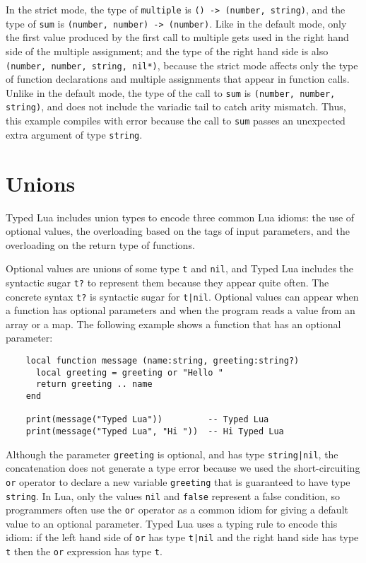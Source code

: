 In the strict mode, the type of \texttt{multiple} is \texttt{() -> (number, string)},
and the type of \texttt{sum} is \texttt{(number, number) -> (number)}.
Like in the default mode, only the first value produced by the
first call to multiple gets used in the right hand side of the
multiple assignment;
and the type of the right hand side is also
\texttt{(number, number, string, nil*)},
because the strict mode affects only the type of function declarations
and multiple assignments that appear in function calls.
Unlike in the default mode, the type of the call to \texttt{sum} is
\texttt{(number, number, string)}, and does not include the
variadic tail to catch arity mismatch.
Thus, this example compiles with error because the call to \texttt{sum}
passes an unexpected extra argument of type \texttt{string}.

\section{Unions}

Typed Lua includes union types to encode three common Lua idioms:
the use of optional values, the overloading based on the tags of
input parameters, and the overloading on the return type of functions.

Optional values are unions of some type \texttt{t} and \texttt{nil},
and Typed Lua includes the syntactic sugar \texttt{t?} to represent
them because they appear quite often.
The concrete syntax \texttt{t?} is syntactic sugar for \texttt{t|nil}.
Optional values can appear when a function has optional parameters
and when the program reads a value from an array or a map.
The following example shows a function that has an optional parameter:
\begin{verbatim}
    local function message (name:string, greeting:string?)
      local greeting = greeting or "Hello "
      return greeting .. name
    end

    print(message("Typed Lua"))         -- Typed Lua
    print(message("Typed Lua", "Hi "))  -- Hi Typed Lua
\end{verbatim}

Although the parameter \texttt{greeting} is optional, and has type
\texttt{string|nil}, the concatenation does not generate a type error
because we used the short-circuiting \texttt{or} operator to declare a
new variable \texttt{greeting} that is guaranteed to have type \texttt{string}. 
In Lua, only the values \texttt{nil} and \texttt{false} represent a
false condition, so programmers often use the \texttt{or} operator as a
common idiom for giving a default value to an optional parameter. 
Typed Lua uses a typing rule to encode this idiom: 
if the left hand side of \texttt{or} has type \texttt{t|nil} and
the right hand side has type \texttt{t} then the \texttt{or} expression has
type \texttt{t}.

